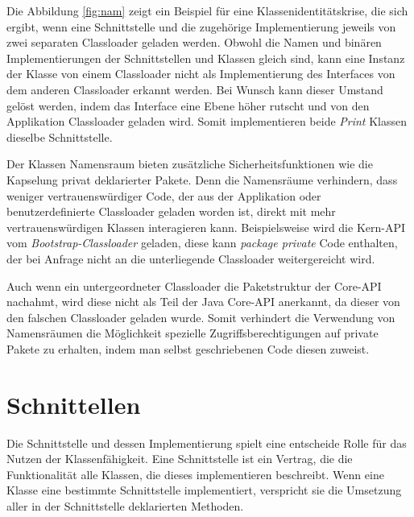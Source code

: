     Die Abbildung \ref{fig:nam} zeigt ein Beispiel für eine Klassenidentitätskrise, die sich ergibt, wenn eine Schnittstelle und die zugehörige Implementierung jeweils von zwei separaten Classloader geladen werden. Obwohl die Namen und binären Implementierungen der Schnittstellen und Klassen gleich sind, kann eine Instanz der Klasse von einem Classloader nicht als Implementierung des Interfaces von dem anderen Classloader erkannt werden. Bei Wunsch kann dieser Umstand gelöst werden, indem das Interface eine Ebene höher rutscht und von den Applikation Classloader geladen wird. Somit implementieren beide \textit{Print} Klassen dieselbe Schnittstelle.\bigbreak 

    Der Klassen Namensraum bieten zusätzliche Sicherheitsfunktionen wie die Kapselung privat deklarierter Pakete. Denn die Namensräume verhindern, dass weniger vertrauenswürdiger Code, der aus der Applikation oder benutzerdefinierte Classloader geladen worden ist, direkt mit mehr vertrauenswürdigen Klassen interagieren kann. Beispielsweise wird die Kern-API vom \textit{Bootstrap-Classloader} geladen, diese kann \textit{package private} Code enthalten, der bei Anfrage nicht an die unterliegende Classloader weitergereicht wird.


    Auch wenn ein untergeordneter Classloader die Paketstruktur der Core-API nachahmt, wird diese nicht als Teil der Java Core-API anerkannt, da dieser von den falschen Classloader geladen wurde. Somit verhindert die Verwendung von Namensräumen die Möglichkeit spezielle Zugriffsberechtigungen auf private Pakete zu erhalten, indem man selbst geschriebenen Code diesen zuweist. \cite{Forman04javareflection}


\section{Schnittellen} \label{sec:kap}
  
  Die Schnittstelle und dessen Implementierung spielt eine entscheide Rolle für das Nutzen der Klassenfähigkeit. Eine Schnittstelle ist ein Vertrag, die die Funktionalität alle Klassen, die dieses implementieren beschreibt. Wenn eine Klasse eine bestimmte Schnittstelle implementiert, verspricht sie die Umsetzung aller in der Schnittstelle deklarierten Methoden.

